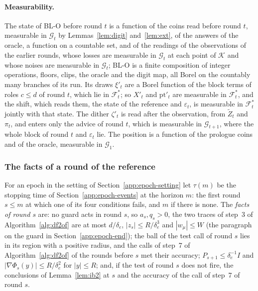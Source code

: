 \documentclass[11pt]{amsart}
\theoremstyle{definition}
\numberwithin{equation}{section}
\newcommand{\cK}{\mathcal{K}}
\newcommand{\cG}{\mathscr{G}}
\newcommand{\cF}{\mathscr{F}}
\begin{document}
\paragraph{Measurability.} The state of BL-O before round $t$ is a function of the coins read before round $t$, measurable in $\cG_t$ by Lemmas~\ref{lem:digit} and~\ref{lem:ext}, of the answers of the oracle, a function on a countable set, and of the readings of the observations of the earlier rounds, whose losses are measurable in $\cG_t$ at each point of $\cK$ and whose noises are measurable in $\cG_t$; BL-O is a finite composition of integer operations, floors, clips, the oracle and the digit map, all Borel on the countably many branches of its run. Its draws $\xi'_t$ are a Borel function of the block terms of roles $c\le d$ of round $t$, which lie in $\cF^*_t$; so $X'_t$ and $\mathrm{pt}'_t$ are measurable in $\cF^*_t$, and the shift, which reads them, the state of the reference and $\varepsilon_t$, is measurable in $\cF^*_t$ jointly with that state. The dither $\zeta'_t$ is read after the observation, from $\tilde Z_t$ and $\pi_t$, and enters only the advice of round $t$, which is measurable in $\cG_{t+1}$, where the whole block of round $t$ and $\varepsilon_t$ lie. The position is a function of the prologue coins and of the oracle, measurable in $\cG_1$.

\subsubsection{The facts of a round of the reference}\label{app:track-hor}

For an epoch in the setting of Section~\ref{app:epoch-setting} let $\tau(m)$ be the stopping time of Section~\ref{app:epoch-events} at the horizon $m$: the first round $s\le m$ at which one of its four conditions fails, and $m$ if there is none. The \emph{facts of round $s$} are: no guard acts in round $s$, so $a_s,q_s>0$, the two traces of step~3 of Algorithm~\ref{alg:df2of} are at most $d/\delta_e$, $|z_s|\le R/\delta_e^3$ and $|w_\mu|\le W$ (the paragraph on the guard in Section~\ref{app:epoch-end}); the ball of the test call of round $s$ lies in its region with a positive radius, and the calls of step~7 of Algorithm~\ref{alg:df2of} of the rounds before $s$ met their accuracy; $P_{s+1}\le\delta_e^{-1}I$ and $|\nabla\Phi_s(y)|\le R/\delta_e^2$ for $|y|\le R$; and, if the test of round $s$ does not fire, the conclusions of Lemma~\ref{lem:ib2} at $s$ and the accuracy of the call of step~7 of round $s$.
\end{document}
